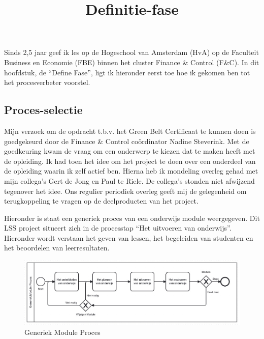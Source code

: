 \documentclass[
  a4paper,
  DIV=11,
  numbers=noendperiod]{scrartcl}
\title{Definitie-fase}
\author{}
\date{}
\renewcommand*\contentsname{Table of contents}
\newcommand\contentsname{Table of contents}
\begin{document}
\maketitle

\renewcommand*\contentsname{Table of contents}
{
\hypersetup{linkcolor=}
\setcounter{tocdepth}{3}
\tableofcontents
}
\listoffigures
\listoftables
Sinds 2,5 jaar geef ik les op de Hogeschool van Amsterdam (HvA) op de
Faculteit Business en Economie (FBE) binnen het cluster Finance \&
Control (F\&C). In dit hoofdstuk, de ``Define Fase'', ligt ik hieronder
eerst toe hoe ik gekomen ben tot het procesverbeter voorstel.

\subsection{Proces-selectie}\label{proces-selectie}

Mijn verzoek om de opdracht t.b.v. het Green Belt Certificaat te kunnen
doen is goedgekeurd door de Finance \& Control coördinator Nadine
Steverink. Met de goedkeuring kwam de vraag om een onderwerp te kiezen
dat te maken heeft met de opleiding. Ik had toen het idee om het project
te doen over een onderdeel van de opleiding waarin ik zelf actief ben.
Hierna heb ik mondeling overleg gehad met mijn collega's Gert de Jong en
Paul te Riele. De collega's stonden niet afwijzend tegenover het idee.
Ons regulier periodiek overleg geeft mij de gelegenheid om
terugkoppeling te vragen op de deelproducten van het project.

Hieronder is staat een generiek proces van een onderwijs module
weergegeven. Dit LSS project situeert zich in de processtap ``Het
uitvoeren van onderwijs''. Hieronder wordt verstaan het geven van
lessen, het begeleiden van studenten en het beoordelen van
leerresultaten.

\begin{figure}[H]

{\centering \includegraphics{./static/module_generiek.jpg}

}

\caption{Generiek Module Proces}

\end{figure}%
\end{document}
